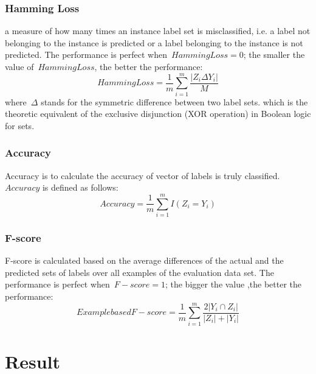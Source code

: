 \documentclass[11pt]{article}
\begin{document}

\subsubsection{Hamming Loss} a measure of how many times an instance label set is misclassified, i.e. a label not belonging to the instance is predicted or a label belonging to the instance is not predicted. The performance is perfect when~$Hamming Loss=0$; the smaller the value of~$Hamming Loss$, the better the performance:
\begin{equation} 
 Hamming Loss= \frac{1}{m}\sum_{i=1}^{m}  \frac{|Z_i\Delta Y_i|}{M}
\end{equation}
where~$\Delta$ stands for the symmetric difference between two label sets. which is the theoretic equivalent of the exclusive disjunction (XOR operation) in Boolean logic for sets.
\subsubsection{Accuracy}
 Accuracy is to calculate the accuracy of vector of labels is truly classified. $ Accuracy$ is defined as follows:
\begin{equation} 
 Accuracy= \frac{1}{m}\sum_{i=1}^{m}  I(Z_i = Y_i)
\end{equation}
\subsubsection{F-score} F-score is calculated based on the average differences of the actual and the predicted sets of labels over all examples of the evaluation data set. The performance is perfect when~$F-score = 1$; the bigger the value ,the better the performance:
\begin{equation} 
 Example based F-score= \frac{1}{m}\sum_{i=1}^{m} \frac{2|Y_i \cap Z_i|}{|Z_i|+|Y_i|}
\end{equation}
\section{Result}
\end{document}
